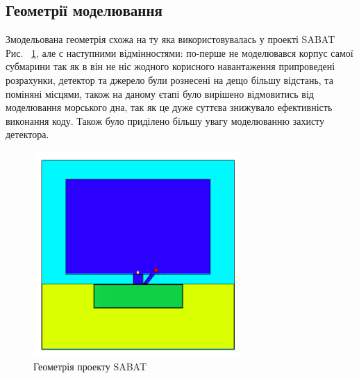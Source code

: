 \documentclass[a4paper, 14pt]{article}
\numberwithin{equation}{section}
\numberwithin{table}{section}
\begin{document}
	\subsection {Геометрії моделювання}
	Змодельована геометрія схожа на ту яка використовувалась у проекті SABAT Рис. ~\ref{ris:SabatG}, але с наступними відмінностями: по-перше не моделювався корпус самої субмарини так як в він не ніс жодного корисного навантаження припроведені розрахунки, детектор та джерело були рознесені на дещо більшу відстань, та поміняні місцями, також на даному єтапі було вирішено відмовитись від моделювання морського дна, так як це дуже суттєва знижувало ефективність виконання коду. Також було приділено більшу увагу моделюванню захисту детектора.
	\begin{figure}[hbt!]
		\centering \includegraphics[width=0.7\textwidth]{images/sabatGeometry.png}
		\caption{Геометрія проекту SABAT} 
		\label{ris:SabatG}	
	\end{figure}
	
\end{document}

